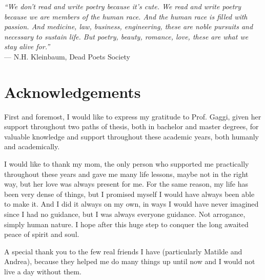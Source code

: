 \cleardoublepage
{}
{}

\begin{flushright}{
    \slshape
    ``We don't read and write poetry because it's cute. We read and write poetry because we are members of the human race. And the human race is filled with passion. And medicine, law, business, engineering, these are noble pursuits and necessary to sustain life. But poetry, beauty, romance, love, these are what we stay alive for.''} \\
    \medskip
    --- N.H. Kleinbaum, Dead Poets Society
\end{flushright}

\begingroup
\let\clearpage\relax
\let\cleardoublepage\relax
\let\cleardoublepage\relax

\chapter*{Acknowledgements}

\noindent First and foremost, I would like to express my gratitude to Prof. Gaggi, given her support throughout two paths of thesis, both in bachelor and master degrees, for valuable knowledge and support throughout these academic years, both humanly and academically. 

\vspace{0.35cm}

\noindent I would like to thank my mom, the only person who supported me practically throughout these years and gave me many life lessons, maybe not in the right way, but her love was always present for me. For the same reason, my life has been very dense of things, but I promised myself I would have always been able to make it. And I did it always on my own, in ways I would have never imagined since I had no guidance, but I was always everyone guidance. Not arrogance, simply human nature. I hope after this huge step to conquer the long awaited peace of spirit and soul. 

\vspace{0.35cm}

\noindent A special thank you to the few real friends I have (particularly Matilde and Andrea), because they helped me do many things up until now and I would not live a day without them.

\vspace{0.75cm}

\noindent{\myLocation, \myTime}
\hfill \textit{\myName}

\endgroup

